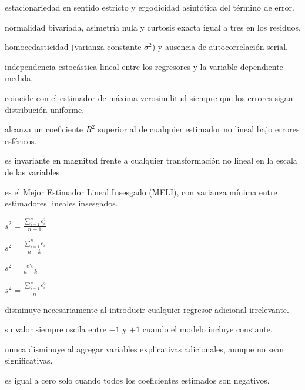 \begin{opts}
    \item estacionariedad en sentido estricto y ergodicidad asintótica del término de error.
    \item normalidad bivariada, asimetría nula y curtosis exacta igual a tres en los residuos.
    \item homocedasticidad (varianza constante $\sigma^2$) y ausencia de autocorrelación serial.
    \item independencia estocástica lineal entre los regresores y la variable dependiente medida.
\end{opts}

\begin{opts}
    \item coincide con el estimador de máxima verosimilitud siempre que los errores sigan distribución uniforme.
    \item alcanza un coeficiente $R^2$ superior al de cualquier estimador no lineal bajo errores esféricos.
    \item es invariante en magnitud frente a cualquier transformación no lineal en la escala de las variables.
    \item es el Mejor Estimador Lineal Insesgado (MELI), con varianza mínima entre estimadores lineales insesgados.
\end{opts}

\begin{opts}
    \item $s^2 = \frac{\sum_{i=1}^n e_i^2}{n - 1}$
    \item $s^2 = \frac{\sum_{i=1}^n e_i}{n - k}$
    \item $s^2 = \frac{e'e}{n - k}$
    \item $s^2 = \frac{\sum_{i=1}^n e_i^2}{n}$
\end{opts}

\begin{opts}
    \item disminuye necesariamente al introducir cualquier regresor adicional irrelevante.
    \item su valor siempre oscila entre $-1$ y $+1$ cuando el modelo incluye constante.
    \item nunca disminuye al agregar variables explicativas adicionales, aunque no sean significativas.
    \item es igual a cero solo cuando todos los coeficientes estimados son negativos.
\end{opts}

